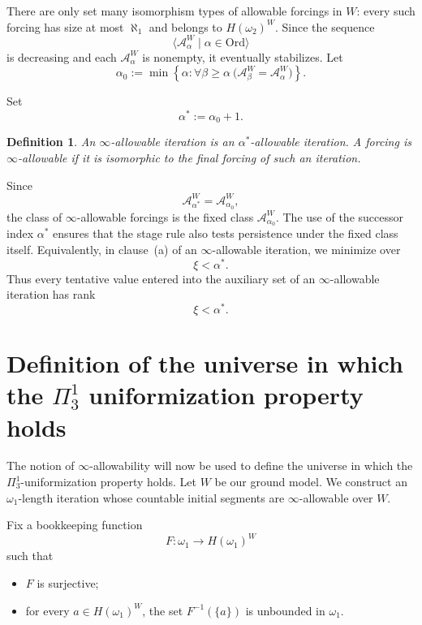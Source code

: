 \documentclass[a4paper,11pt]{article}
\newtheorem{definition}[theorem]{Definition}
\begin{document}
There are only set many isomorphism types of allowable forcings in $W$: every such forcing has size at most $\aleph_1$ and belongs to $H(\omega_2)^W$.  Since the sequence
\[
   \langle\mathcal A^W_\alpha\mid\alpha\in\mathrm{Ord}\rangle
\]
is decreasing and each $\mathcal A^W_\alpha$ is nonempty, it eventually stabilizes.  Let
\[
   \alpha_0
   :=\min\left\{\alpha:
      \forall\beta\geq\alpha\ \bigl(\mathcal A^W_\beta=\mathcal A^W_\alpha\bigr)
   \right\}.
\]

Set
\[
   \alpha^\ast:=\alpha_0+1.
\]

\begin{definition}
An \emph{$\infty$-allowable iteration} is an $\alpha^\ast$-allowable iteration.  A forcing is \emph{$\infty$-allowable} if it is isomorphic to the final forcing of such an iteration.
\end{definition}

Since
\[
   \mathcal A^W_{\alpha^\ast}=\mathcal A^W_{\alpha_0},
\]
the class of $\infty$-allowable forcings is the fixed class $\mathcal A^W_{\alpha_0}$.  The use of the successor index $\alpha^\ast$ ensures that the stage rule also tests persistence under the fixed class itself.  Equivalently, in clause~\textup{(a)} of an $\infty$-allowable iteration, we minimize over
\[
   \xi<\alpha^\ast.
\]
Thus every tentative value entered into the auxiliary set of an $\infty$-allowable iteration has rank
\[
   \xi<\alpha^\ast.
\]




\section[Definition of the universe with Pi13 uniformization]{Definition of the universe in which the ${\Pi^1_3}$ uniformization property holds}
\label{section-L-final-uniformization}
The notion of $\infty$-allowability will now be used to define the universe in which the ${\Pi^1_3}$-uniformization property holds.  Let $W$ be our ground model.  We construct an $\omega_1$-length iteration whose countable initial segments are $\infty$-allowable over $W$.

Fix a bookkeeping function
\[
   F:\omega_1\longrightarrow H(\omega_1)^W
\]
such that
\begin{itemize}
\item $F$ is surjective;
\item for every $a\in H(\omega_1)^W$, the set $F^{-1}(\{a\})$ is unbounded in $\omega_1$.
\end{itemize}
\end{document}
